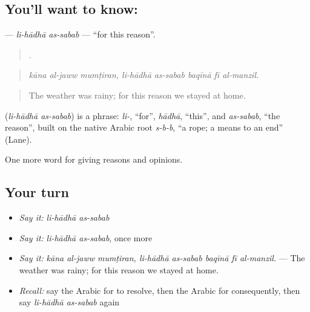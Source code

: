 \subsection*{You'll want to know:  }
\textbf{ } — \emph{li-hādhā as-sabab} — \textquotedblleft{}for this reason\textquotedblright{}.

\begin{quote}
       .
\end{quote}

\begin{quote}
\emph{kāna al-jaww mumṭiran, li-hādhā as-sabab baqīnā fī al-manzil.}
\end{quote}

\begin{quote}
The weather was rainy; for this reason we stayed at home.
\end{quote}

\begin{cousinweb}
\textbf{ } (\emph{li-hādhā as-sabab}) is a phrase: \emph{li-}, \textquotedblleft{}for\textquotedblright{}, \emph{hādhā}, \textquotedblleft{}this\textquotedblright{}, and \emph{as-sabab}, \textquotedblleft{}the reason\textquotedblright{}, built on the native Arabic root \emph{s-b-b}, \textquotedblleft{}a rope; a means to an end\textquotedblright{} (Lane).
\end{cousinweb}

\begin{grammarlens}[title={What you've built}]
One more word for giving reasons and opinions.
\end{grammarlens}

\subsection*{Your turn}
\begin{itemize}
\raggedright
  \item \emph{Say it:} \emph{li-hādhā as-sabab}
  \item \emph{Say it:} \emph{li-hādhā as-sabab}, once more
  \item \emph{Say it:} \emph{kāna al-jaww mumṭiran, li-hādhā as-sabab baqīnā fī al-manzil.} — The weather was rainy; for this reason we stayed at home.
  \item \emph{Recall:} say the Arabic for to resolve, then the Arabic for consequently, then say \emph{li-hādhā as-sabab} again
\end{itemize}

